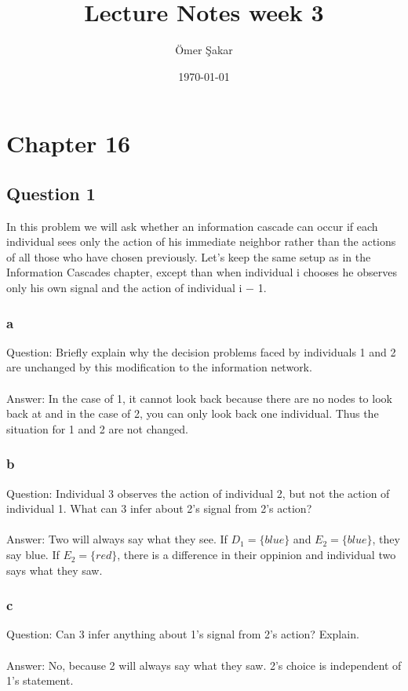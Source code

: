 \documentclass[12pt]{scrartcl}
\title{Lecture Notes week 3}
\author{\"Omer \c Sakar}
\date{\today}
\begin{document}
\maketitle
\tableofcontents
\newpage

\section{Chapter 16}

\subsection{Question 1}
In this problem we will ask whether an information cascade can occur if each individual
sees only the action of his immediate neighbor rather than the actions of all those who
have chosen previously. Let’s keep the same setup as in the Information Cascades
chapter, except than when individual i chooses he observes only his own signal and the
action of individual i − 1.
\subsubsection*{a}
Question: Briefly explain why the decision problems faced by individuals 1 and 2 are unchanged by this modification to the information network.\\ \\
Answer: In the case of 1, it cannot look back because there are no nodes to look back at and in the case of 2, you can only look back one individual. Thus the situation for 1 and 2 are not changed.

\subsubsection*{b}
Question: Individual 3 observes the action of individual 2, but not the action of individual 1. What can 3 infer about 2’s signal from 2’s action?\\\\
Answer: Two will always say what they see. If $D_{1} = \{blue\}$ and $E_{2} = \{blue\}$, they say blue. If $E_{2} = \{red\}$, there is a difference in their oppinion and individual two says what they saw.


\subsubsection*{c}
Question: Can 3 infer anything about 1’s signal from 2’s action? Explain.\\\\
Answer: No, because 2 will always say what they saw. 2's choice is independent of 1's statement.
\end{document}
